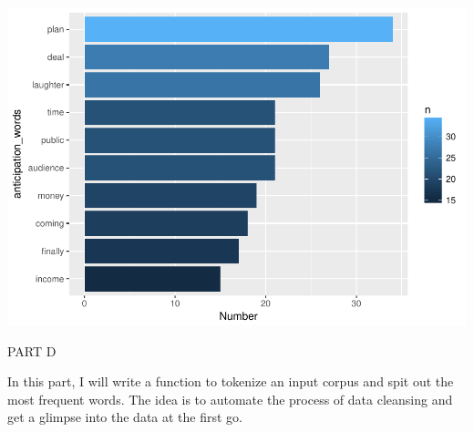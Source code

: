 \documentclass[]{article}
\begin{document}
\includegraphics{Donald_Trump_Speech_sentiment_analysis_files/figure-latex/unnamed-chunk-39-1.pdf}

PART D

In this part, I will write a function to tokenize an input corpus and
spit out the most frequent words. The idea is to automate the process of
data cleansing and get a glimpse into the data at the first go.
\end{document}
